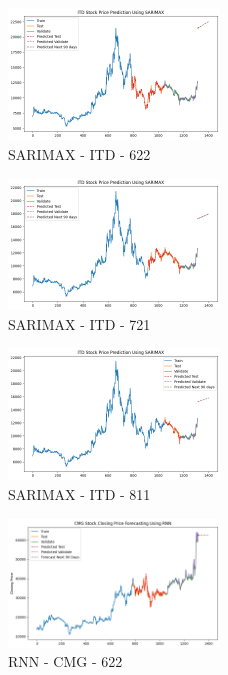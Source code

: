 \documentclass{ieeeojies}
\begin{document}
\begin{figure} [H]
    \centering
    \includegraphics[width=0.5\textwidth]{bibliography/Figure/SARIMAX_ITD_622_90.png}
    \caption{SARIMAX - ITD - 622}
    \label{fig:SARIMAX_ITD_622_90}
\end{figure}
\begin{figure} [H]
    \centering
    \includegraphics[width=0.5\textwidth]{bibliography/Figure/SARIMAX_ITD_721_90.png}
    \caption{SARIMAX - ITD - 721}
    \label{fig:SARIMAX_ITD_721_90}
\end{figure}
\begin{figure} [H]
    \centering
    \includegraphics[width=0.5\textwidth]{bibliography/Figure/SARIMAX_ITD_811_90.png}
    \caption{SARIMAX - ITD - 811}
    \label{fig:SARIMAX_ITD_811_90}
\end{figure}
\begin{figure} [H]
    \centering
    \includegraphics[width=0.5\textwidth]{bibliography/Figure/RNN_CMG_622_90.png}
    \caption{RNN - CMG - 622}
    \label{fig:RNN_CMG_622_90}
\end{figure}
\end{document}

